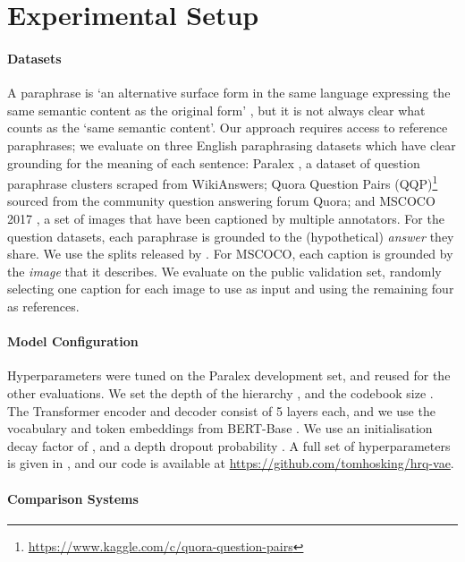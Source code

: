 \documentclass[11pt]{article}
\begin{document}
\section{Experimental Setup}


\paragraph{Datasets}

A paraphrase is `an alternative surface form in the
same language expressing the same semantic content as the original
form' \cite{madnanidorr}, but it is not always clear what counts as the `same semantic content'. Our approach requires access to reference paraphrases; we evaluate on three English paraphrasing datasets which have clear grounding for the meaning of each sentence: Paralex
\cite{fader-etal-2013-paraphrase}, a dataset of question paraphrase
clusters scraped from WikiAnswers; Quora Question Pairs
(QQP)\footnote{\mbox{\url{https://www.kaggle.com/c/quora-question-pairs}}}
sourced from the community question answering forum Quora; and MSCOCO 2017 \cite{mscoco}, a set of images that have been captioned by multiple annotators. For the question datasets, each paraphrase is grounded to the (hypothetical) \textit{answer} they share. We use the splits released by \citet{hosking-lapata-2021-factorising}. For MSCOCO, each caption is grounded by the \textit{image} that it describes. We evaluate on the public validation set, randomly selecting one caption for each image to use as input and using the remaining four as references.

\paragraph{Model Configuration}

Hyperparameters were tuned on the Paralex development set, and reused for the other evaluations. We set the depth of the hierarchy , and the codebook size . The Transformer encoder and decoder consist of 5 layers each, and we use the vocabulary and token embeddings from BERT-Base \cite{devlin_bert:_2018}. We use an initialisation decay factor of , and a depth dropout probability . A full set of hyperparameters is given in , and our code is available at {\url{ https://github.com/tomhosking/hrq-vae}}.



\paragraph{Comparison Systems}
\end{document}
